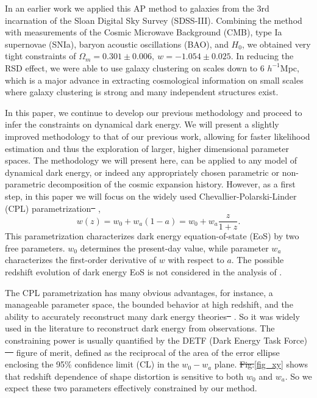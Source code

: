 \documentclass[iop]{emulateapj}
\providecommand{\DIFadd}[1]{{\protect\color{blue}\uwave{#1}}} %
\providecommand{\DIFdel}[1]{{\protect\color{red}\sout{#1}}}                      %
\providecommand{\DIFaddbegin}{} %
\providecommand{\DIFaddend}{} %
\providecommand{\DIFdelbegin}{} %
\providecommand{\DIFdelend}{} %
\begin{document}
\DIFaddend In an earlier work\citep{Li2016} we applied this AP method to galaxies from the 3rd incarnation of the Sloan Digital Sky Survey (SDSS-III). 
Combining the method with measurements of the Cosmic Microwave Background (CMB), type Ia supernovae (SNIa), 
baryon acoustic oscillations (BAO), and $H_0$,
we obtained very tight constraints of $ \Omega_m = 0.301 \pm 0.006,\ w=-1.054 \pm 0.025$.
In reducing the RSD effect, 
we were able to use galaxy clustering on scales down to 6 $h^{-1}$Mpc,
which is a major advance in extracting cosmological information 
on small scales where galaxy clustering is strong and many independent structures exist.



In this paper, we continue to develop our previous methodology and proceed to infer the constraints on dynamical dark energy. 
We will present a slightly improved methodology to that of our previous work\citep{Li2016}, 
allowing for faster likelihood estimation and thus the exploration of larger, higher dimensional parameter spaces. 
The methodology we will present here, can be applied to any model of dynamical dark energy, 
or indeed any appropriately chosen parametric or non-parametric decomposition of the cosmic expansion history. 
However, as a first step, in this paper we will focus on the widely used Chevallier-Polarski-Linder (CPL) parametrization\DIFdelbegin \DIFdel{\mbox{%
\cite{CPL_CP,CPL_L}}%
}\DIFdelend \DIFaddbegin \DIFadd{\mbox{%
\citep{CPL_CP,CPL_L}}%
}\DIFaddend ,
\begin{equation}
w(z) = w_0 + w_a (1-a) = w_0 + w_a \frac{z}{1+z}.
\end{equation}
This parametrization characterizes dark energy equation-of-state (EoS) by two free parameters.
$w_0$ determines the present-day value, while parameter $w_a$ characterizes the first-order derivative of $w$ with respect to $a$. 
The possible redshift evolution of dark energy EoS is not considered in the analysis of \cite{Li2016}. 

The CPL parametrization has many obvious advantages, for instance, a manageable parameter space, 
the bounded behavior at high redshift, 
and the ability to accurately reconstruct many dark energy theories\DIFdelbegin \DIFdel{\mbox{%
\cite{CPL_L}}%
}\DIFdelend \DIFaddbegin \DIFadd{\mbox{%
\citep{CPL_L}}%
}\DIFaddend . 
So it was widely used in the literature to reconstruct dark energy from observations.
The constraining power is usually quantified by the DETF (Dark Energy Task Force) \DIFdelbegin \DIFdel{\mbox{%
\cite{DETF} }%
}\DIFdelend \DIFaddbegin \DIFadd{\mbox{%
\citep{DETF} }%
}\DIFaddend figure of merit, 
defined as the reciprocal of the area of the error ellipse enclosing the 95\% confidence limit (CL) in the $w_0-w_a$ plane. 
\DIFdelbegin \DIFdel{Fig.}\DIFdelend \DIFaddbegin \DIFadd{Figure }\DIFaddend \ref{fig_xy} shows that redshift dependence of shape distortion is sensitive to both $w_0$ and $w_a$.
So we expect these two parameters effectively constrained by our method.
\end{document}
